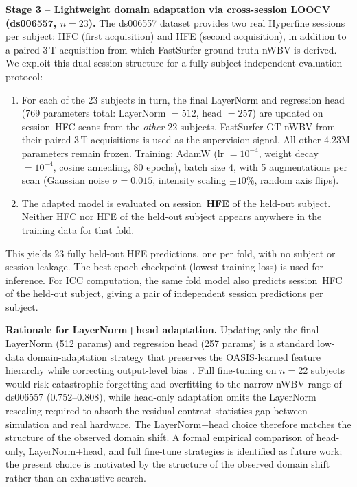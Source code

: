\documentclass[12pt,a4paper]{article}
\begin{document}
\textbf{Stage 3 -- Lightweight domain adaptation via cross-session LOOCV
(ds006557, $n=23$).}
The ds006557 dataset provides two real Hyperfine sessions per subject:
HFC (first acquisition) and HFE (second acquisition), in addition to a
paired 3\,T acquisition from which FastSurfer ground-truth nWBV is derived.
We exploit this dual-session structure for a fully subject-independent
evaluation protocol:

\begin{enumerate}
  \item For each of the 23 subjects in turn, the final LayerNorm and
        regression head (769 parameters total: LayerNorm $= 512$,
        head $= 257$) are updated on session~HFC scans from the
        \emph{other} 22 subjects. FastSurfer GT nWBV from their paired
        3\,T acquisitions is used as the supervision signal. All other
        4.23M parameters remain frozen. Training: AdamW
        (lr $= 10^{-4}$, weight decay $= 10^{-4}$, cosine annealing,
        80 epochs), batch size 4, with 5 augmentations per scan
        (Gaussian noise $\sigma = 0.015$, intensity scaling $\pm 10$\%,
        random axis flips).
  \item The adapted model is evaluated on session~\textbf{HFE} of the
        held-out subject. Neither HFC nor HFE of the held-out subject
        appears anywhere in the training data for that fold.
\end{enumerate}

This yields 23 fully held-out HFE predictions, one per fold, with no
subject or session leakage. The best-epoch checkpoint (lowest training loss)
is used for inference. For ICC computation, the same fold model also
predicts session~HFC of the held-out subject, giving a pair of independent
session predictions per subject.

\textbf{Rationale for LayerNorm+head adaptation.}
Updating only the final LayerNorm (512 params) and regression head
(257 params) is a standard low-data domain-adaptation strategy that
preserves the OASIS-learned feature hierarchy while correcting
output-level bias~\cite{karani2018lifelong}. Full fine-tuning on $n=22$
subjects would risk catastrophic forgetting and overfitting to the
narrow nWBV range of ds006557 (0.752--0.808), while head-only adaptation
omits the LayerNorm rescaling required to absorb the residual
contrast-statistics gap between simulation and real hardware. The
LayerNorm+head choice therefore matches the structure of the observed
domain shift. A formal empirical comparison of head-only,
LayerNorm+head, and full fine-tune strategies is identified as future
work; the present choice is motivated by the structure of the observed
domain shift rather than an exhaustive search.
\end{document}
